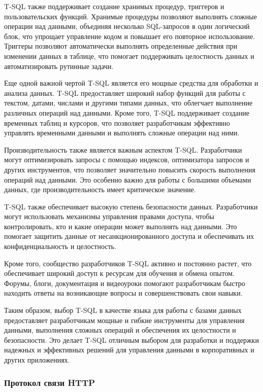 T-SQL также поддерживает создание хранимых процедур, триггеров и пользовательских функций. Хранимые процедуры позволяют выполнять сложные операции над данными, объединяя несколько SQL-запросов в один логический блок, что упрощает управление кодом и повышает его повторное использование. Триггеры позволяют автоматически выполнять определенные действия при изменении данных в таблице, что помогает поддерживать целостность данных и автоматизировать рутинные задачи.

Еще одной важной чертой T-SQL является его мощные средства для обработки и анализа данных. T-SQL предоставляет широкий набор функций для работы с текстом, датами, числами и другими типами данных, что облегчает выполнение различных операций над данными. Кроме того, T-SQL поддерживает создание временных таблиц и курсоров, что позволяет разработчикам эффективно управлять временными данными и выполнять сложные операции над ними.

Производительность также является важным аспектом T-SQL. Разработчики могут оптимизировать запросы с помощью индексов, оптимизатора запросов и других инструментов, что позволяет значительно повысить скорость выполнения операций над данными. Это особенно важно для работы с большими объемами данных, где производительность имеет критическое значение.

T-SQL также обеспечивает высокую степень безопасности данных. Разработчики могут использовать механизмы управления правами доступа, чтобы контролировать, кто и какие операции может выполнять над данными. Это помогает защитить данные от несанкционированного доступа и обеспечивать их конфиденциальность и целостность.

Кроме того, сообщество разработчиков T-SQL активно и постоянно растет, что обеспечивает широкий доступ к ресурсам для обучения и обмена опытом. Форумы, блоги, документация и видеоуроки помогают разработчикам быстро находить ответы на возникающие вопросы и совершенствовать свои навыки.

Таким образом, выбор T-SQL в качестве языка для работы с базами данных предоставляет разработчикам мощные и гибкие инструменты для управления данными, выполнения сложных операций и обеспечения их целостности и безопасности. Это делает T-SQL отличным выбором для разработки и поддержки надежных и эффективных решений для управления данными в корпоративных и других приложениях.

\subsubsection{Протокол связи HTTP}

